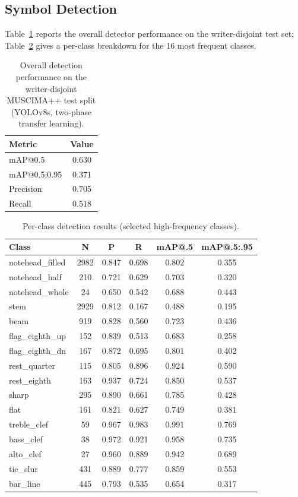 \documentclass[conference]{IEEEtran}
\begin{document}
\subsection{Symbol Detection}
Table~\ref{tab:overall} reports the overall detector performance on the
writer-disjoint test set; Table~\ref{tab:perclass} gives a per-class
breakdown for the 16 most frequent classes.

\begin{table}[h]
\caption{Overall detection performance on the writer-disjoint MUSCIMA++ test
split (YOLOv8s, two-phase transfer learning).}
\label{tab:overall}
\centering
\begin{tabular}{lc}
\toprule
\textbf{Metric} & \textbf{Value} \\
\midrule
mAP@0.5         & 0.630 \\
mAP@0.5:0.95    & 0.371 \\
Precision       & 0.705 \\
Recall          & 0.518 \\
\bottomrule
\end{tabular}
\end{table}

\begin{table}[h]
\caption{Per-class detection results (selected high-frequency classes).}
\label{tab:perclass}
\centering
\small
\begin{tabular}{lccccc}
\toprule
\textbf{Class} & \textbf{N} & \textbf{P} & \textbf{R} & \textbf{mAP@.5} & \textbf{mAP@.5:.95} \\
\midrule
notehead\_filled  & 2982 & 0.847 & 0.698 & 0.802 & 0.355 \\
notehead\_half    &  210 & 0.721 & 0.629 & 0.703 & 0.320 \\
notehead\_whole   &   24 & 0.650 & 0.542 & 0.688 & 0.443 \\
stem              & 2929 & 0.812 & 0.167 & 0.488 & 0.195 \\
beam              &  919 & 0.828 & 0.560 & 0.723 & 0.436 \\
flag\_eighth\_up  &  152 & 0.839 & 0.513 & 0.683 & 0.258 \\
flag\_eighth\_dn  &  167 & 0.872 & 0.695 & 0.801 & 0.402 \\
rest\_quarter     &  115 & 0.805 & 0.896 & 0.924 & 0.590 \\
rest\_eighth      &  163 & 0.937 & 0.724 & 0.850 & 0.537 \\
sharp             &  295 & 0.890 & 0.661 & 0.785 & 0.428 \\
flat              &  161 & 0.821 & 0.627 & 0.749 & 0.381 \\
treble\_clef      &   59 & 0.967 & 0.983 & 0.991 & 0.769 \\
bass\_clef        &   38 & 0.972 & 0.921 & 0.958 & 0.735 \\
alto\_clef        &   27 & 0.960 & 0.889 & 0.942 & 0.689 \\
tie\_slur         &  431 & 0.889 & 0.777 & 0.859 & 0.553 \\
bar\_line         &  445 & 0.793 & 0.535 & 0.654 & 0.317 \\
\bottomrule
\end{tabular}
\end{table}
\end{document}

